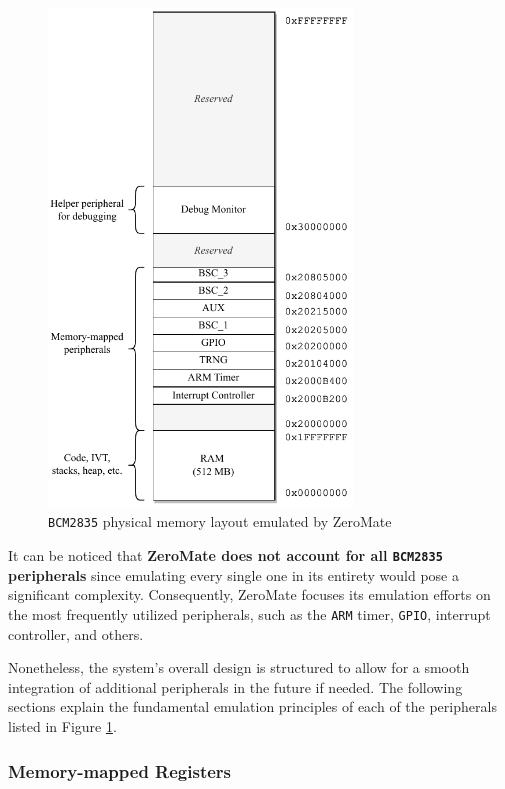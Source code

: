 \documentclass[english, ing, kiv, he, iso690numb, pdf]{fasthesis}
\begin{document}
	\begin{figure}[ht]
		\centering
		\includegraphics[width=0.72\textwidth]{img/diagrams/address_space.pdf}
		\caption{\texttt{BCM2835} physical memory layout emulated by ZeroMate}
		\label{BCM2835 memory layout emulated by ZeroMate}
	\end{figure}
	
	It can be noticed that \textbf{ZeroMate does not account for all \texttt{BCM2835} peripherals} since emulating every single one in its entirety would pose a significant complexity. Consequently, ZeroMate focuses its emulation efforts on the most frequently utilized peripherals, such as the \texttt{ARM} timer, \texttt{GPIO}, interrupt controller, and others.
	
	Nonetheless, the system's overall design is structured to allow for a smooth integration of additional peripherals in the future if needed. The following sections explain the fundamental emulation principles of each of the peripherals listed in Figure \ref{BCM2835 memory layout emulated by ZeroMate}.
	
	\subsubsection{Memory-mapped Registers} \label{Memory-mapped Registers}
	
\end{document}
